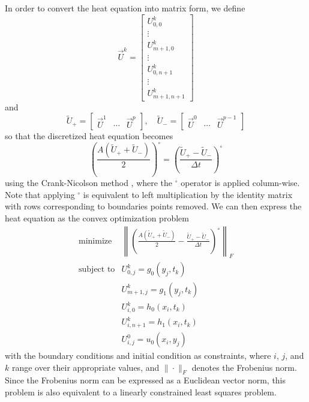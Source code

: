 \documentclass[conference]{IEEEtran}
\begin{document}
In order to convert the heat equation into matrix form, we define
\begin{equation}
  \vec{U}^k = \begin{bmatrix}
    U_{0,0}^k \\ \vdots \\ U_{m+1,0}^k \\ \vdots \\ U_{0,n+1}^k \\ \vdots \\ U_{m+1,n+1}^k
  \end{bmatrix}
\end{equation}
and
\begin{equation}
  \widetilde{U}_+ = \begin{bmatrix}
    \vec{U}^1 & \cdots & \vec{U}^p
  \end{bmatrix}, \quad \widetilde{U}_- = \begin{bmatrix}
    \vec{U}^0 & \cdots & \vec{U}^{p-1}
  \end{bmatrix}
\end{equation}
so that the discretized heat equation becomes
\begin{equation}
  \left(\frac{A(\widetilde{U}_+ + \widetilde{U}_-)}{2}\right)^\circ = \left(\frac{\widetilde{U}_+ - \widetilde{U}_-}{\Delta t}\right)^\circ
\end{equation}
using the Crank-Nicolson method , where the ${}^\circ$ operator is applied column-wise. Note that applying ${}^\circ$ is equivalent to left multiplication by the identity matrix with rows corresponding to boundaries points removed. We can then express the heat equation as the convex optimization problem
\begin{equation}
  \begin{array}{lll}
    \text{minimize} & \left\|\left(\frac{A(\widetilde{U}_+ + \widetilde{U}_-)}{2} - \frac{\widetilde{U}_+ - \widetilde{U}_-}{\Delta t}\right)^\circ\right\|_F \\
    \text{subject to} & U_{0,j}^k = g_0(y_j, t_k) \\
    & U_{m+1,j}^k = g_1(y_j, t_k) \\
    & U_{i,0}^k = h_0(x_i, t_k) \\
    & U_{i,n+1}^k = h_1(x_i, t_k) \\
    & U_{i,j}^0 = u_0(x_i, y_j)
  \end{array}
\end{equation}
with the boundary conditions and initial condition as constraints, where $i$, $j$, and $k$ range over their appropriate values, and $\|\cdot\|_F$ denotes the Frobenius norm. Since the Frobenius norm can be expressed as a Euclidean vector norm, this problem is also equivalent to a linearly constrained least squares problem.
\end{document}
